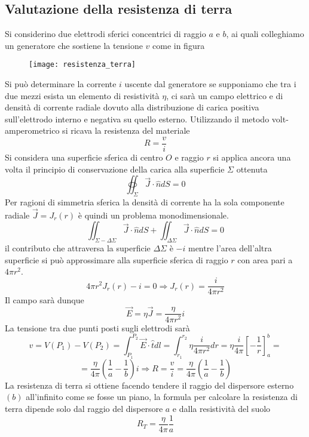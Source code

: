 \subsection{Valutazione della resistenza di terra}
Si considerino due elettrodi sferici concentrici di raggio $a$ e $b$, ai quali colleghiamo 
un generatore che sostiene la tensione $v$ come in figura
\begin{figure}[H]
\centering
\texttt{[image: resistenza\_terra]}
\end{figure}
Si può determinare la corrente $i$ uscente dal generatore se supponiamo che tra i due mezzi
esista un elemento di resistività $\eta$, ci sarà un campo elettrico e di densità di 
corrente radiale dovuto alla 
distribuzione di carica positiva sull'elettrodo interno e negativa su quello esterno.
Utilizzando il metodo volt-amperometrico si ricava la resistenza del materiale
$$
R = \frac{v}{i}
$$
Si considera una superficie sferica di centro $O$ e raggio $r$ si applica ancora una volta
il principio di conservazione della carica alla superficie $\Sigma$ ottenuta
$$
\oiint_\Sigma \vec{J}\cdot\hat{n}dS = 0
$$
Per ragioni di simmetria sferica la densità di corrente ha la sola componente radiale
$\vec{J} = J_r(r)$ è quindi un problema monodimensionale.
$$
\iint_{\Sigma -\Delta\Sigma} \vec{J}\cdot\hat{n}dS + \iint_{\Delta\Sigma} \vec{J}
\cdot\hat{n}dS = 0
$$
il contributo che attraversa la superficie $\Delta\Sigma$ è $-i$ mentre l'area
dell'altra superficie si può approssimare alla superficie sferica di raggio $r$ con area
pari a $4\pi r^2$.
$$
4\pi r^2 J_r(r) - i = 0 \Rightarrow J_r(r) = \frac{i}{4\pi r^2}
$$
Il campo sarà dunque
$$
\vec{E} = \eta\vec{J} = \frac{\eta}{4\pi r^2} i
$$
\newpage
La tensione tra due punti posti sugli elettrodi sarà
$$
v = V(P_1) - V(P_2) = \int_{P_1}^{P_2} \vec{E}\cdot\hat{t}dl = \int_{r_1}^{r_2}
\eta\frac{i}{4\pi r^2} dr = \eta \frac{i}{4\pi} \left[-\frac{1}{r}\right]_a^b  = 
$$
$$
= \frac{\eta}{4\pi}\left(\frac{1}{a} -\frac{1}{b}\right) i \Rightarrow R = \frac{v}{i} = 
\frac{\eta}{4\pi}\left(\frac{1}{a} - \frac{1}{b}\right)
$$
La resistenza di terra si ottiene facendo tendere il raggio del dispersore esterno $(b)$
all'infinito come se fosse un piano, la formula per calcolare la resistenza di terra
dipende solo dal raggio del dispersore $a$ e dalla resistività del suolo
$$
R_T = \frac{\eta}{4\pi}\frac{1}{a}
$$

